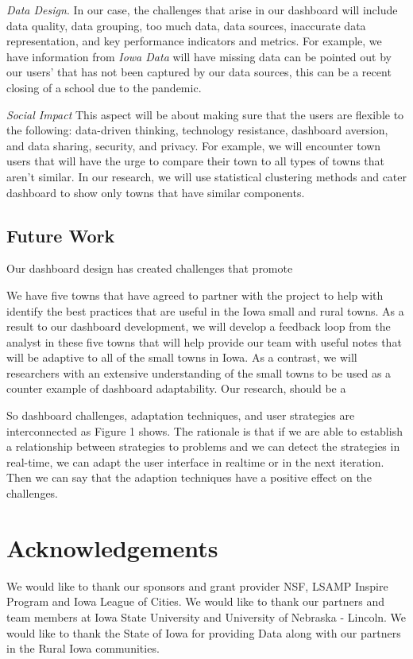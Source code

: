 \documentclass[10pt]{article}\usepackage[]{graphicx}\usepackage[]{color}
\begin{document}
{\it Data Design}. In our case, the challenges that arise in our dashboard will include data quality, data grouping, too much data, data sources, inaccurate data representation, and key performance indicators and metrics. For example, we have information from {\it Iowa Data} will have missing data can be pointed out by our users' that has not been captured by our data sources, this can be a recent closing of a school due to the pandemic.

{\it Social Impact} This aspect will be about making sure that the users are flexible to the following: data-driven thinking, technology resistance, dashboard aversion, and data sharing, security, and privacy. For example, we will encounter town users that will have the urge to compare their town to all types of towns that aren't similar. In our research, we will use statistical clustering methods and cater dashboard to show only towns that have similar components.

\subsection{Future Work}
Our dashboard design has created challenges that promote 

We have five towns that have agreed to partner with the project to help with identify the best practices that are useful in the Iowa small and rural towns. As a result to our dashboard development, we will develop a feedback loop from the analyst in these five towns that will help provide our team with useful notes that will be adaptive to all of the small towns in Iowa. As a contrast, we will researchers with an extensive understanding of the small towns to be used as a counter example of dashboard adaptability. Our research, should be a 

So dashboard challenges,
adaptation techniques, and user strategies are interconnected as
Figure 1 shows. The rationale is that if we are able to establish
a relationship between strategies to problems and we can detect
the strategies in real-time, we can adapt the user interface in realtime or in the next iteration. Then we can say that the adaption
techniques have a positive effect on the challenges.
\section{Acknowledgements}
We would like to thank our sponsors and grant provider NSF, LSAMP Inspire Program and Iowa League of Cities. We would like to thank our partners and team members at Iowa State University and University of Nebraska - Lincoln. We would like to thank the State of Iowa for providing Data along with our partners in the Rural Iowa communities.



\end{document}
